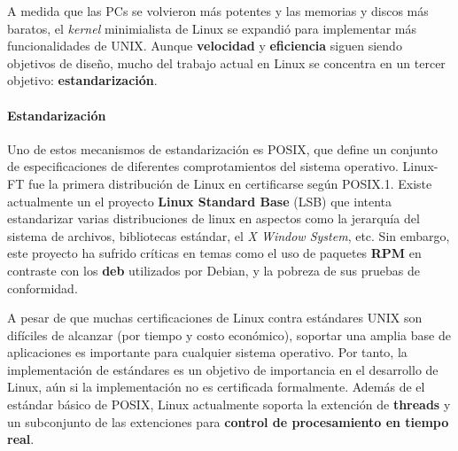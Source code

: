 \documentclass[spanish]{article}
\begin{document}
A medida que las PCs se volvieron más potentes y las memorias y discos más baratos, el \textit{kernel} minimialista de Linux se expandió para implementar más funcionalidades de UNIX. Aunque \textbf{velocidad} y \textbf{eficiencia} siguen siendo objetivos de diseño, mucho del trabajo actual en Linux se concentra en un tercer objetivo: \textbf{estandarización}. 

\paragraph{Estandarización} Uno de estos mecanismos de estandarización es POSIX, que define un conjunto de especificaciones de diferentes comprotamientos del sistema operativo. Linux-FT fue la primera distribución de Linux en certificarse según POSIX.1. Existe actualmente un el proyecto \textbf{Linux Standard Base} (LSB)\cite{LSBWikipedia} que intenta estandarizar varias distribuciones de linux en aspectos como la jerarquía del sistema de archivos, bibliotecas est\'{a}ndar, el \textit{X Window System}, etc. Sin embargo, este proyecto ha sufrido críticas en temas como el uso de paquetes \textbf{RPM} en contraste con los \textbf{deb} utilizados por Debian, y la pobreza de sus pruebas de conformidad.

A pesar de que muchas certificaciones de Linux contra estándares UNIX son difíciles de alcanzar (por tiempo y costo económico), soportar una amplia base de aplicaciones es importante para cualquier sistema operativo. Por tanto, la implementación de estándares es un objetivo de importancia en el desarrollo de Linux, aún si la implementación no es certificada formalmente. Además de el estándar básico de POSIX, Linux actualmente soporta la extención de \textbf{threads} y un subconjunto de las extenciones para \textbf{control de procesamiento en tiempo real}.
\end{document}
